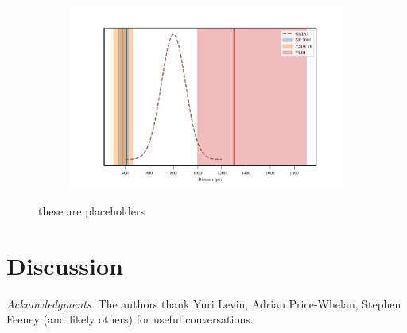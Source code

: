 \documentclass[iop,apj]{emulateapj}
\begin{document}
\begin{figure}
    \begin{subfigure}
        \centering
        \includegraphics[scale=.5]{../figures/J1024_distances.pdf}
        \caption{}\label{fig:fig_c}
    \end{subfigure}
\caption{these are placeholders}
\end{figure}

\section{Discussion}



\acknowledgements

\emph{Acknowledgments.}
The authors thank Yuri Levin, Adrian Price-Whelan, Stephen Feeney (and likely others) for useful conversations.






\end{document}
